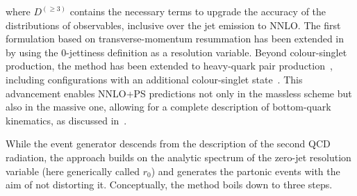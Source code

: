 \documentclass[11pt,a4paper]{article}
\begin{document}
where $D^{(\geq 3)}$ contains the necessary terms to upgrade the
accuracy of the distributions of observables, inclusive over the jet
emission to NNLO. The first formulation based on transverse-momentum resummation has been extended in~ by using the 0-jettiness definition as a resolution variable. Beyond colour-singlet production, the \minnlo{} method has been extended to heavy-quark pair production~\cite{mazzitelli:2020jio,mazzitelli:2021mmm}, including configurations with an additional colour-singlet state~\cite{mazzitelli:2024ura}. This advancement enables NNLO+PS predictions not only in the massless scheme but also in the massive one, allowing for a complete description of bottom-quark kinematics, as discussed in~.

While the \minnlo{} event generator descends from the \POWHEG{}
description of the second QCD radiation, the \GENEVA{} approach
\cite{Alioli:2015toa, Gavardi:2023aco} builds on the analytic spectrum
of the zero-jet resolution variable (here generically called $r_0$)
and generates the partonic events with the aim of not distorting
it. Conceptually, the \GENEVA{} method boils down to three steps.
\end{document}
